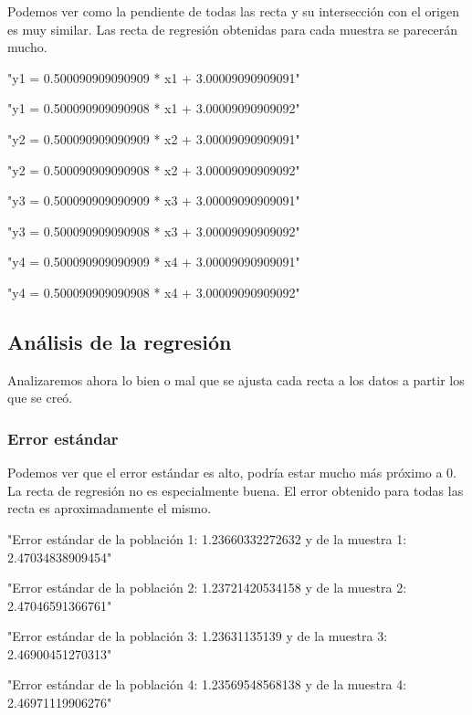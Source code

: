 \documentclass [a4paper] {article}
\begin{document}
Podemos ver como la pendiente de todas las recta y su intersección con el origen es muy similar.
Las recta de regresión obtenidas para cada muestra se parecerán mucho.
\begin{Schunk}
\begin{Soutput}
[1] "y1 = 0.500090909090909 * x1 + 3.00009090909091"
\end{Soutput}
\begin{Soutput}
[1] "y1 = 0.500090909090908 * x1 + 3.00009090909092"
\end{Soutput}
\begin{Soutput}
[1] "y2 = 0.500090909090909 * x2 + 3.00009090909091"
\end{Soutput}
\begin{Soutput}
[1] "y2 = 0.500090909090908 * x2 + 3.00009090909092"
\end{Soutput}
\begin{Soutput}
[1] "y3 = 0.500090909090909 * x3 + 3.00009090909091"
\end{Soutput}
\begin{Soutput}
[1] "y3 = 0.500090909090908 * x3 + 3.00009090909092"
\end{Soutput}
\begin{Soutput}
[1] "y4 = 0.500090909090909 * x4 + 3.00009090909091"
\end{Soutput}
\begin{Soutput}
[1] "y4 = 0.500090909090908 * x4 + 3.00009090909092"
\end{Soutput}
\end{Schunk}

\subsection{Análisis de la regresión}
Analizaremos ahora lo bien o mal que se ajusta cada recta a los datos a partir los que se creó.

\subsubsection{Error estándar}
Podemos ver que el error estándar es alto, podría estar mucho más próximo a 0.
La recta de regresión no es especialmente buena.
El error obtenido para todas las recta es aproximadamente el mismo.
\begin{Schunk}
\begin{Soutput}
[1] "Error estándar de la población 1: 1.23660332272632 y de la muestra 1: 2.47034838909454"
\end{Soutput}
\begin{Soutput}
[1] "Error estándar de la población 2: 1.23721420534158 y de la muestra 2: 2.47046591366761"
\end{Soutput}
\begin{Soutput}
[1] "Error estándar de la población 3: 1.23631135139 y de la muestra 3: 2.46900451270313"
\end{Soutput}
\begin{Soutput}
[1] "Error estándar de la población 4: 1.23569548568138 y de la muestra 4: 2.46971119906276"
\end{Soutput}
\end{Schunk}
\end{document}
